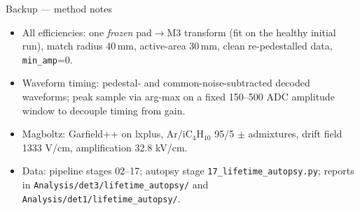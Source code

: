 \documentclass[10pt,aspectratio=169]{beamer}
\begin{document}
\begin{frame}{Backup --- method notes}
\footnotesize
\begin{itemize}
  \item All efficiencies: one \emph{frozen} pad$\to$M3 transform (fit on the
        healthy initial run), match radius 40\,mm, active-area 30\,mm, clean
        re-pedestalled data, \texttt{min\_amp}=0.
  \item Waveform timing: pedestal- and common-noise-subtracted decoded
        waveforms; peak sample via arg-max on a fixed 150--500 ADC amplitude
        window to decouple timing from gain.
  \item Magboltz: Garfield++ on lxplus, Ar/iC$_4$H$_{10}$ 95/5 $\pm$ admixtures,
        drift field 1333 V/cm, amplification 32.8 kV/cm.
  \item Data: pipeline stages 02--17; autopsy stage \texttt{17\_lifetime\_autopsy.py};
        reports in \texttt{Analysis/det3/lifetime\_autopsy/} and
        \texttt{Analysis/det1/lifetime\_autopsy/}.
\end{itemize}
\end{frame}
\end{document}
